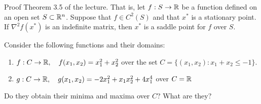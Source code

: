 \documentclass{ExerciseSheet}
\newif\ifsolutions
\begin{document}
\fi

\vskip 0.5cm 
\begin{problem}
Proof Theorem 3.5 of the lecture. That is, let $f: S \rightarrow \mathbb{R}$ be a function defined on an open set $S \subset \mathbb{R}^n$. Suppose that $f\in C^2(S)$ and that $x^*$ is a stationary point. 
If $\nabla^2f(x^*)$ is an indefinite matrix, then $x^*$ is a saddle point for $f$ over $S$.
\end{problem}

\ifsolutions
\vskip 0.3cm

\begin{solution}
Since $\nabla^2f(x^*)$ is indefinite, it has at least one positive eigenvalue $\lambda >0$. Let $v$ be a corresponding normed eigenvector. As $S$ is an open set, there exists a $r>0$ s.t. $x^*\alpha v \in S$ for all $\alpha \in [0, r]$. 

We use the quadratic approximation theorem and the fact that $x^*$ is a stationary point, i.e. has zero gradient to get the existence of a function $g: \R_+ \rightarrow \R$ s.t. \begin{equation*}
    \frac{g(t)}{t} \rightarrow 0, \text{as } t\rightarrow 0. 
\end{equation*}
Therefore for any $\alpha \in (0,r)$ we have 
\begin{align*}
    f(x^*+\alpha v) &= f(x^*) + \frac{\alpha^2}{2}v^T \nabla^2f(x^*)v + g(\alpha^2 \|v\|^2) \\
    &=f(x^*) + \frac{\lambda \alpha^2}{2} \|v\|^2 + g(\|v\|^2\alpha^2) \\
    &= f(x^*) + \frac{\lambda \alpha^2}{2} + g(\alpha^2).
\end{align*}
There exists an $r_0$ s.t. for all $\alpha \in (0, r_0)$ we have $g(\alpha^2)>-\frac{\lambda}{2}\alpha^2$ and hence $f(x^*+\alpha v) > f(x)$. Therefore, $x^*$ cannot be a local maximum point of f over $S$.

Repeat the same argument with a negative eigenvalue and a corresponding eigenvector to also show $x^*$ cannot be a local minimum. 
\end{solution}

\fi

\vskip 0.5cm

\begin{exo}
Consider the following functions and their domains:
\begin{enumerate}
    \item  $f:C \rightarrow \mathbb{R}, \quad f(x_1, x_2)=x_1^2+x_2^2$ over the set $C=\{(x_1, x_2): x_1+x_2 \leq -1\}$. 
    \item $g:C \rightarrow \mathbb{R}, \quad g(x_1, x_2)= -2x_1^2 + x_1x_2^2+4x_1^4$ over $C=\mathbb{R}$
\end{enumerate}
Do they obtain their minima and maxima over $C$?
What are they? \\
\end{exo}
\end{document}
